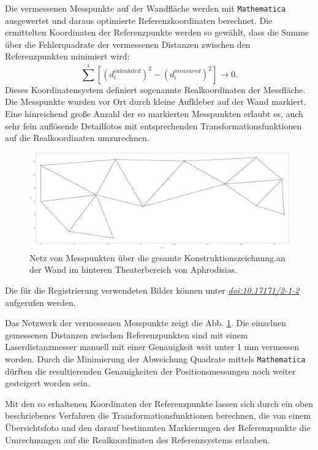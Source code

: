 \documentclass[twocolumn]{bmcart}
\begin{document}
Die vermessenen Messpunkte auf der Wandfläche werden mit \texttt{Mathematica} ausgewertet und daraus optimierte Referenzkoordinaten  berechnet. Die ermittelten Koordinaten der Referenzpunkte werden so gewählt, dass die Summe über die Fehlerquadrate der vermessenen Distanzen zwischen den Referenzpunkten  minimiert wird:
\begin{equation}
\sum^i [(d^{calculated}_i)^2 - (d^{measured}_i)^2] \rightarrow 0.
\end{equation}
Dieses Koordinatensystem definiert sogenannte Realkoordinaten der Messfläche. Die Messpunkte wurden vor Ort durch kleine Aufkleber auf der Wand markiert. Eine hinreichend große Anzahl  der so markierten Messpunkten erlaubt es, auch sehr fein auflösende Detailfotos mit entsprechenden Transformationsfunktionen auf die Realkoordinaten umzurechnen.

\begin{figure}
	\centering
	\includegraphics[width=1\linewidth]{figures/Messpunktnetz.pdf}
	\caption{Netz von Messpunkten über die gesamte Konstruktionszeichnung.an der Wand im hinteren Theaterbereich von Aphrodisias.}
	\label{fig:messpunktnetz}
\end{figure}

Die für die Registrierung verwendeten Bilder können unter \href{http://dx.doi.org/10.17171/2-1-2}{\textit{doi:10.17171/2-1-2}} aufgerufen werden.

Das Netzwerk der vermessenen Messpunkte zeigt die Abb. \ref{fig:messpunktnetz}. Die einzelnen  gemessenen Distanzen zwischen Referenzpunkten sind mit einem Laserdistanzmesser manuell  mit einer Genauigkeit weit unter 1 mm vermessen worden. Durch die Minimierung der Abweichung Quadrate mittels  \texttt{Mathematica} dürften die resultierenden Genauigkeiten der Positionsmessungen noch weiter gesteigert worden sein.

Mit den so erhaltenen Koordinaten der Referenzpunkte lassen sich durch ein oben beschriebenes Verfahren die Transformationsfunktionen berechnen, die von einem Übersichtsfoto und den darauf bestimmten Markierungen der Referenzpunkte die Umrechnungen auf die Realkoordinaten des Referenzsystems erlauben.
\end{document}
